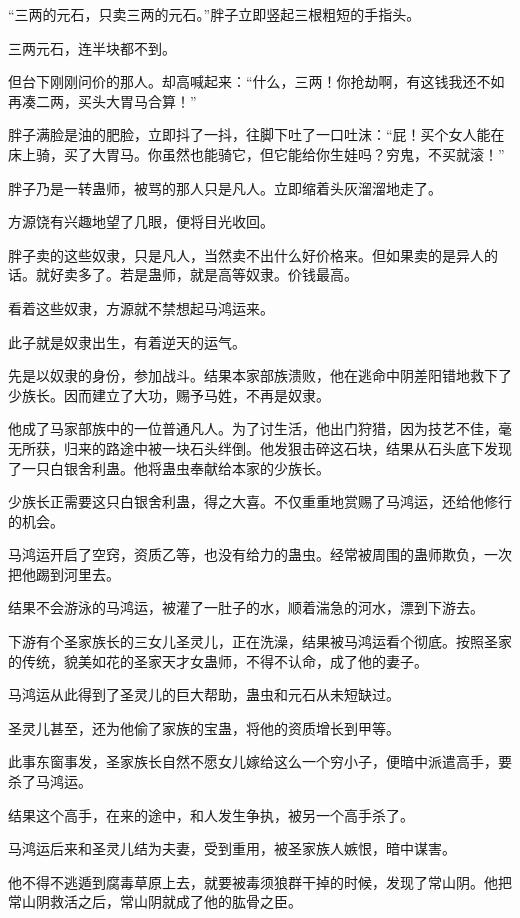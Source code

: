 \begin{this_body}
“三两的元石，只卖三两的元石。”胖子立即竖起三根粗短的手指头。

三两元石，连半块都不到。

但台下刚刚问价的那人。却高喊起来：“什么，三两！你抢劫啊，有这钱我还不如再凑二两，买头大胃马合算！”

胖子满脸是油的肥脸，立即抖了一抖，往脚下吐了一口吐沫：“屁！买个女人能在床上骑，买了大胃马。你虽然也能骑它，但它能给你生娃吗？穷鬼，不买就滚！”

胖子乃是一转蛊师，被骂的那人只是凡人。立即缩着头灰溜溜地走了。

方源饶有兴趣地望了几眼，便将目光收回。

胖子卖的这些奴隶，只是凡人，当然卖不出什么好价格来。但如果卖的是异人的话。就好卖多了。若是蛊师，就是高等奴隶。价钱最高。

看着这些奴隶，方源就不禁想起马鸿运来。

此子就是奴隶出生，有着逆天的运气。

先是以奴隶的身份，参加战斗。结果本家部族溃败，他在逃命中阴差阳错地救下了少族长。因而建立了大功，赐予马姓，不再是奴隶。

他成了马家部族中的一位普通凡人。为了讨生活，他出门狩猎，因为技艺不佳，毫无所获，归来的路途中被一块石头绊倒。他发狠击碎这石块，结果从石头底下发现了一只白银舍利蛊。他将蛊虫奉献给本家的少族长。

少族长正需要这只白银舍利蛊，得之大喜。不仅重重地赏赐了马鸿运，还给他修行的机会。

马鸿运开启了空窍，资质乙等，也没有给力的蛊虫。经常被周围的蛊师欺负，一次把他踢到河里去。

结果不会游泳的马鸿运，被灌了一肚子的水，顺着湍急的河水，漂到下游去。

下游有个圣家族长的三女儿圣灵儿，正在洗澡，结果被马鸿运看个彻底。按照圣家的传统，貌美如花的圣家天才女蛊师，不得不认命，成了他的妻子。

马鸿运从此得到了圣灵儿的巨大帮助，蛊虫和元石从未短缺过。

圣灵儿甚至，还为他偷了家族的宝蛊，将他的资质增长到甲等。

此事东窗事发，圣家族长自然不愿女儿嫁给这么一个穷小子，便暗中派遣高手，要杀了马鸿运。

结果这个高手，在来的途中，和人发生争执，被另一个高手杀了。

马鸿运后来和圣灵儿结为夫妻，受到重用，被圣家族人嫉恨，暗中谋害。

他不得不逃遁到腐毒草原上去，就要被毒须狼群干掉的时候，发现了常山阴。他把常山阴救活之后，常山阴就成了他的肱骨之臣。


\end{this_body}
